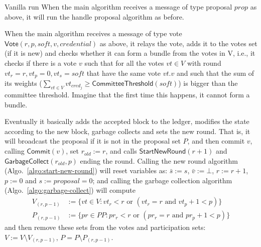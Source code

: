 \documentclass[10pt,a4paper]{article}
\begin{document}
\begin{section}{Vanilla run}
    When the main algorithm receives a message of type proposal 
    $prop$ as above, it will
    run the handle proposal algorithm as before.
    
    When the main algorithm receives a message of type vote 
    $\mathsf{Vote}(r,p,soft,v,credential)$ as above, it relays the vote, adds it to the
    votes set (if it is new) and checks whether it can form a bundle from the 
    votes in V, i.e., it checks if there is a vote $v$ such that for all the votes 
    $vt\in V$ with round $vt_r=r, vt_p=0, vt_s=soft$ that have the same vote $vt.v$ 
    and such that the sum of its weights ($\sum_{vt\in V} vt_{cred_j}\ge \mathsf{CommitteeThreshold}(soft)$) 
    is bigger than the committee threshold. 
    Imagine that the first time this happens, it cannot form a bundle. 
    
    Eventually it basically adds the accepted block to the ledger, modifies the state according
    to the new block, garbage collects and sets the new round.
    That is, it will broadcast the proposal if it is not in the proposal set $P$,
    and then commit $v$, calling $\mathsf{Commit}(v)$, set $r_{old}:=r$,
    and calls $\mathsf{StartNewRound}(r+1)$ and $\mathsf{GarbageCollect}(r_{old},p)$
    ending the round.
    Calling the new round algorithm (Algo.~\ref{algo:start-new-round}) will
    reset variables as: $\bar s:=s$, $\bar{v}:=\bot$, $r:=r+1$, $p:=0$ and
    $s:=proposal=0$;
    and calling the garbage collection algorithm (Algo.~\ref{algo:garbage-collect}) 
    will compute 
    $$
    \begin{array}{rl}
    V_{(r,p-1)} & :=\{vt\in V : vt_r < r \text{ or } (vt_r = r \text{ and } vt_p + 1 < p)\}\\
    P_{(r,p-1)} & :=\{pr\in PP: pr_r < r \text{ or } (pr_r = r \text{ and } pr_p + 1 < p)\}
    \end{array}
    $$%
    and then remove these sets from the votes and participation sets: $V:=V\setminus V_{(r,p-1)}$,
    $P = P\setminus P_{(r,p-1)}$.
    
    
    

\end{section}
\end{document}
